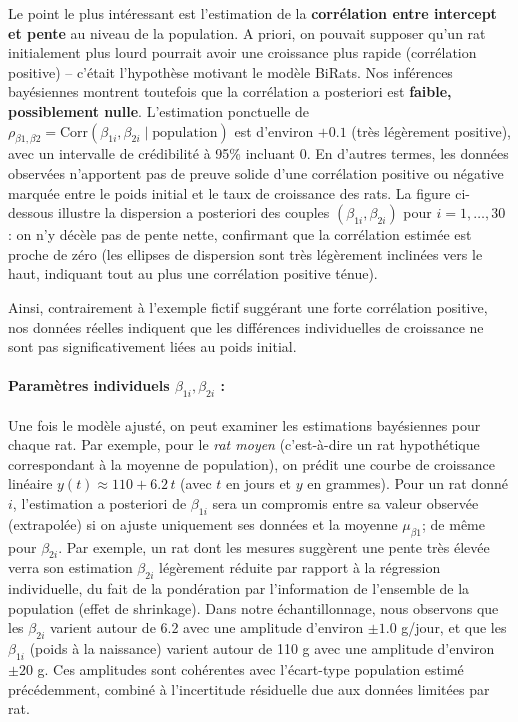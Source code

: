 \documentclass[12pt]{article}
\begin{document}
Le point le plus intéressant est l’estimation de la \textbf{corrélation entre intercept et pente} au niveau de la population. A priori, on pouvait supposer qu’un rat initialement plus lourd pourrait avoir une croissance plus rapide (corrélation positive) – c’était l’hypothèse motivant le modèle BiRats. Nos inférences bayésiennes montrent toutefois que la corrélation a posteriori est \textbf{faible, possiblement nulle}. L’estimation ponctuelle de $\rho_{\beta1,\beta2}=\text{Corr}(\beta_{1i},\beta_{2i}\mid \text{population})$ est d’environ $+0.1$ (très légèrement positive), avec un intervalle de crédibilité à 95\% incluant 0. En d’autres termes, les données observées n’apportent pas de preuve solide d’une corrélation positive ou négative marquée entre le poids initial et le taux de croissance des rats. La figure ci-dessous illustre la dispersion a posteriori des couples $(\beta_{1i},\beta_{2i})$ pour $i=1,\dots,30$ : on n’y décèle pas de pente nette, confirmant que la corrélation estimée est proche de zéro (les ellipses de dispersion sont très légèrement inclinées vers le haut, indiquant tout au plus une corrélation positive ténue). 


Ainsi, contrairement à l’exemple fictif suggérant une forte corrélation positive, nos données réelles indiquent que les différences individuelles de croissance ne sont pas significativement liées au poids initial.

\paragraph{Paramètres individuels $\beta_{1i}, \beta_{2i}$ :} Une fois le modèle ajusté, on peut examiner les estimations bayésiennes pour chaque rat. Par exemple, pour le \emph{rat moyen} (c’est-à-dire un rat hypothétique correspondant à la moyenne de population), on prédit une courbe de croissance linéaire $y(t) \approx 110 + 6.2\,t$ (avec $t$ en jours et $y$ en grammes). Pour un rat donné $i$, l’estimation a posteriori de $\beta_{1i}$ sera un compromis entre sa valeur observée (extrapolée) si on ajuste uniquement ses données et la moyenne $\mu_{\beta1}$; de même pour $\beta_{2i}$. Par exemple, un rat dont les mesures suggèrent une pente très élevée verra son estimation $\beta_{2i}$ légèrement réduite par rapport à la régression individuelle, du fait de la pondération par l’information de l’ensemble de la population (effet de shrinkage). Dans notre échantillonnage, nous observons que les $\beta_{2i}$ varient autour de 6.2 avec une amplitude d’environ $\pm1.0$ g/jour, et que les $\beta_{1i}$ (poids à la naissance) varient autour de 110 g avec une amplitude d’environ $\pm20$ g. Ces amplitudes sont cohérentes avec l’écart-type population estimé précédemment, combiné à l’incertitude résiduelle due aux données limitées par rat.
\end{document}
